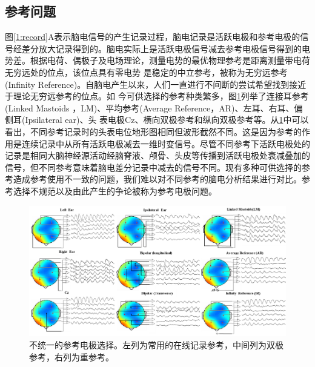 \subsection{参考问题}
图\ref{1:record}A表示脑电信号的产生记录过程，脑电记录是活跃电极和参考电极的信号经差分放大记录得到的。脑电实际上是活跃电极信号减去参考电极信号得到的电势差。根据电荷、偶极子及电场理论，测量电势的最优物理参考是距离测量带电荷无穷远处的位点，该位点具有零电势
是稳定的中立参考，被称为无穷远参考(Infinity Reference)。自脑电产生以来，人们一直进行不间断的尝试希望找到接近于理论无穷远参考的位点。如
今可供选择的参考种类繁多，图\ref{1:ref}列举了连接耳参考(Linked Mastoids
，LM)、平均参考(Average Reference，AR)、左耳、右耳、偏侧耳(Ipsilateral ear)、头
表电极Cz、横向双极参考和纵向双极参考等。从\ref{1:ref}中可以看出，不同参考记录时的头表电位地形图相同但波形截然不同。这是因为参考的作用是连续记录中从所有活跃电极减去一维时变信号。尽管不同参考下活跃电极处的记录是相同大脑神经源活动经脑脊液、颅骨、头皮等传播到活跃电极处衰减叠加的信号，但不同参考意味着脑电差分记录中减去的信号不同。现有多种可供选择的参考造成参考使用不一致的问题，我们难以对不同参考的脑电分析结果进行对比。参考选择不规范以及由此产生的争论被称为参考电极问题。
\begin{figure}[!h]
	\includegraphics[width=15cm]{pic/xulun/EEGref.png}
	\caption{不统一的参考电极选择。左列为常用的在线记录参考，中间列为双极参考，右列为重参考。}
	\label{1:ref}
\end{figure}

